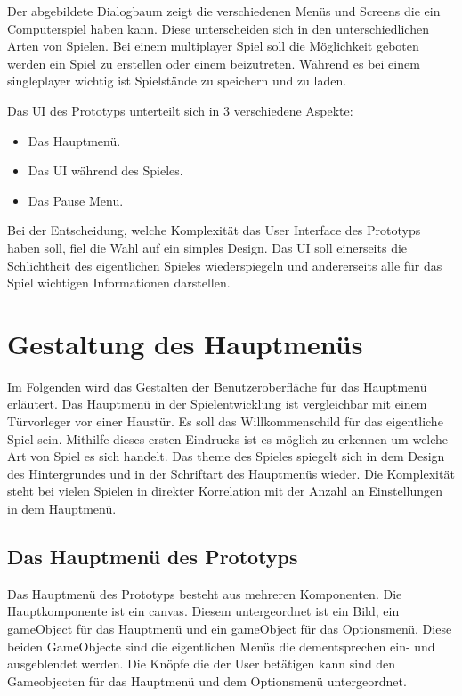 Der abgebildete Dialogbaum zeigt die verschiedenen Menüs und Screens die ein Computerspiel haben kann.
Diese unterscheiden sich in den unterschiedlichen Arten von Spielen. 
Bei einem \gls{multiplayer} Spiel soll die Möglichkeit geboten werden ein Spiel zu erstellen oder einem beizutreten. 
Während es bei einem \gls{singleplayer} wichtig ist Spielstände zu speichern und zu laden.

\pagebreak

Das \gls{UI} des Prototyps unterteilt sich in 3 verschiedene Aspekte:

\begin{itemize}
    \item Das Hauptmenü.
    \item Das \gls{UI} während des Spieles.
    \item Das Pause Menu.
\end{itemize}

\noindent
Bei der Entscheidung, welche Komplexität das User Interface des Prototyps haben soll, fiel die Wahl auf ein simples Design. 
Das \gls{UI} soll einerseits die Schlichtheit des eigentlichen Spieles wiederspiegeln und andererseits alle für das Spiel wichtigen Informationen darstellen.

\section{Gestaltung des Hauptmenüs}

Im Folgenden wird das Gestalten der Benutzeroberfläche für das Hauptmenü erläutert. 
Das Hauptmenü in der Spielentwicklung ist vergleichbar mit einem Türvorleger vor einer Haustür. Es soll das Willkommenschild für das eigentliche Spiel sein. 
Mithilfe dieses ersten Eindrucks ist es möglich zu erkennen um welche Art von Spiel es sich handelt. Das \gls{theme} des Spieles spiegelt sich in dem Design des Hintergrundes und in der Schriftart des Hauptmenüs wieder. Die Komplexität steht bei vielen Spielen in direkter Korrelation mit der Anzahl an Einstellungen in dem Hauptmenü.

\pagebreak

\subsection{Das Hauptmenü des Prototyps}

Das Hauptmenü des Prototyps besteht aus mehreren Komponenten. Die Hauptkomponente ist ein \gls{canvas}. Diesem untergeordnet ist ein Bild, ein \gls{gameObject} für das Hauptmenü und ein \gls{gameObject} für das Optionsmenü. Diese beiden GameObjecte sind die eigentlichen Menüs die dementsprechen ein- und ausgeblendet werden. Die Knöpfe die der User betätigen kann sind den Gameobjecten für das Hauptmenü und dem Optionsmenü untergeordnet. 
